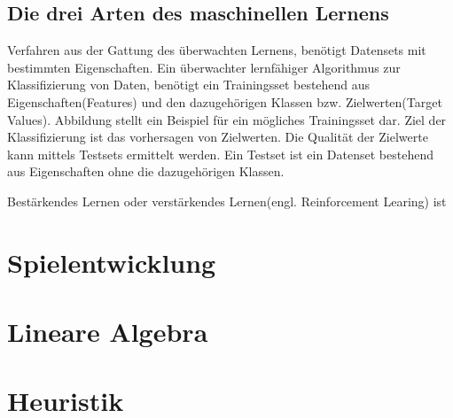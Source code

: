 \subsection{Die drei Arten des maschinellen Lernens}
\label{subsec:Die drei Arten des maschinellen Lernens}


Verfahren aus der Gattung des überwachten Lernens,  benötigt Datensets mit bestimmten Eigenschaften. Ein überwachter lernfähiger Algorithmus zur Klassifizierung von Daten, benötigt ein Trainingsset bestehend aus Eigenschaften(Features) und den dazugehörigen Klassen bzw. Zielwerten(Target Values). Abbildung  stellt ein Beispiel für ein mögliches Trainingsset dar. Ziel der Klassifizierung ist das vorhersagen von Zielwerten. Die Qualität der Zielwerte kann mittels Testsets ermittelt werden. Ein Testset ist ein Datenset bestehend aus Eigenschaften ohne die dazugehörigen Klassen.


Bestärkendes Lernen oder verstärkendes Lernen(engl. Reinforcement Learing) ist 

\section{Spielentwicklung}

\section{Lineare Algebra}

\section{Heuristik}